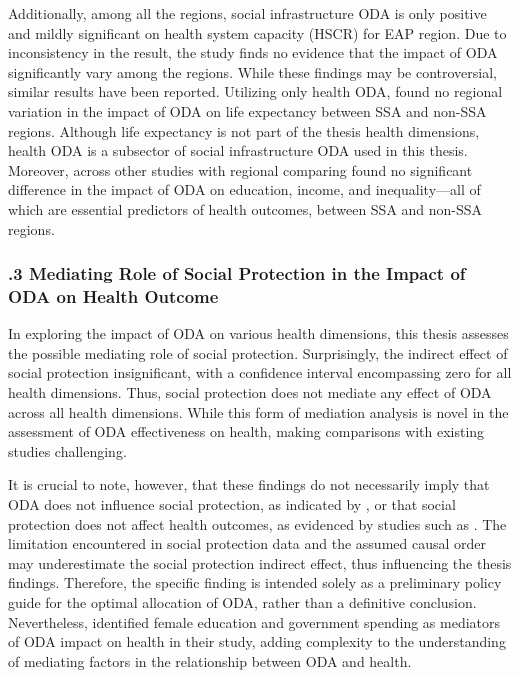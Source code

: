 Additionally, among all the regions, social infrastructure ODA is only positive and mildly significant on health system capacity (HSCR) for EAP region. Due to inconsistency in the result, the study finds no evidence that the impact of ODA significantly vary among the regions. While these findings may be controversial, similar results have been reported. Utilizing only health ODA, \textcite{nwude_official_2020} found no regional variation in the impact of ODA on life expectancy between SSA and non-SSA regions. Although life expectancy is not part of the thesis health dimensions, health ODA is a subsector of social infrastructure ODA used in this thesis. Moreover, across other studies \parencite{gama_health_2015, staicu2017study, shafiullah_foreign_2011} with regional comparing found no significant difference in the impact of ODA on education, income, and inequality—all of which are essential predictors of health outcomes, between SSA and non-SSA regions.


\subsubsection*{.3  Mediating Role of Social Protection in the Impact of ODA on Health Outcome}

In exploring the impact of ODA on various health dimensions, this thesis assesses the possible mediating role of social protection. Surprisingly, the indirect effect of social protection insignificant, with a confidence interval encompassing zero for all health dimensions. Thus, social protection does not mediate any effect of ODA across all health dimensions. While this form of mediation analysis is novel in the assessment of ODA effectiveness on health, making comparisons with existing studies challenging.

It is crucial to note, however, that these findings do not necessarily imply that ODA does not influence social protection, as indicated by \textcite{nino-zarazua_aids_2023}, or that social protection does not affect health outcomes, as evidenced by studies such as \textcite{sepehri_how_2014, sarkodie_effect_2021, heggebo_disentangling_2020, adato_social_2009}. The limitation encountered in social protection data and the assumed causal order may underestimate the social protection indirect effect, thus influencing the thesis findings. Therefore, the specific finding is intended solely as a preliminary policy guide for the optimal allocation of ODA, rather than a definitive conclusion. Nevertheless, \textcite{yogo_health_2015} identified female education and government spending as mediators of ODA impact on health in their study, adding complexity to the understanding of mediating factors in the relationship between ODA and health.


